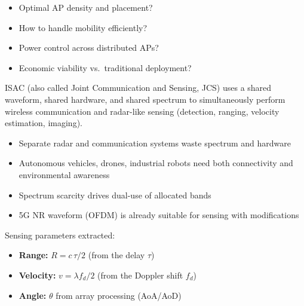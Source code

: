 \begin{itemize}
\tightlist
\item
  Optimal AP density and placement?
\item
  How to handle mobility efficiently?
\item
  Power control across distributed APs?
\item
  Economic viability vs. traditional deployment?
\end{itemize}



\CNchained{}

\CNchained{}

ISAC (also called Joint Communication and Sensing, JCS) uses a shared waveform, shared hardware, and shared spectrum to simultaneously perform wireless communication and radar-like sensing (detection, ranging, velocity estimation, imaging).


\begin{itemize}
\tightlist
\item
  Separate radar and communication systems waste spectrum and hardware
\item
  Autonomous vehicles, drones, industrial robots need both connectivity and environmental awareness
\item
  Spectrum scarcity drives dual-use of allocated bands
\item
  5G NR waveform (OFDM) is already suitable for sensing with modifications
\end{itemize}




Sensing parameters extracted:

\begin{itemize}
\tightlist
\item
  \textbf{Range:} $R = c\,\tau/2$ (from the delay $\tau$)
\item
  \textbf{Velocity:} $v = \lambda f_d / 2$ (from the Doppler shift $f_d$)
\item
  \textbf{Angle:} $\theta$ from array processing (AoA/\allowbreak{}AoD)
\end{itemize}

